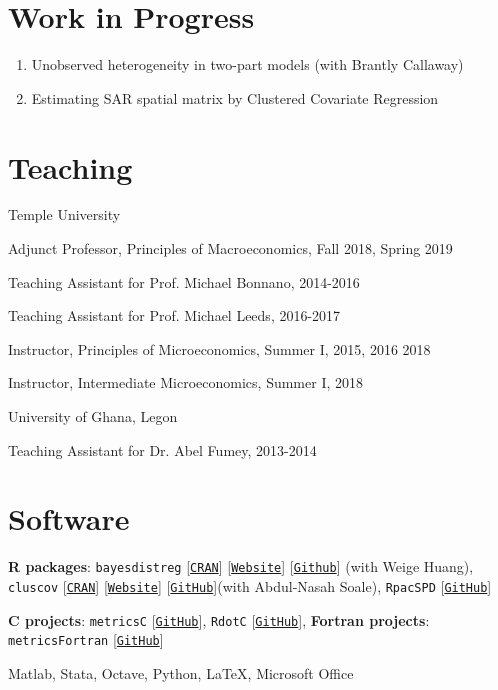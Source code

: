 \documentclass[letterpaper]{article}
\renewenvironment{itemize}{
  \begin{list}{}{
    \setlength{\leftmargin}{1.5em}
  }
}{
  \end{list}
}
\begin{document}
\section*{Work in Progress}
\begin{enumerate}
	\item Unobserved heterogeneity in two-part models (with Brantly Callaway)
	\item Estimating SAR spatial matrix by Clustered Covariate Regression
\end{enumerate}

\section*{Teaching}
\begin{enumerate}
	\item Temple University
	\begin{itemize}
		\item Adjunct Professor, Principles of Macroeconomics, Fall 2018, Spring 2019
		\item Teaching Assistant for Prof. Michael Bonnano, 2014-2016
		\item Teaching Assistant for Prof. Michael Leeds, 2016-2017
		\item Instructor, Principles of Microeconomics, Summer I, 2015, 2016 2018
		\item Instructor, Intermediate Microeconomics, Summer I, 2018
	\end{itemize}
	\item University of Ghana, Legon
	\begin{itemize}
		\item Teaching Assistant for Dr. Abel Fumey, 2013-2014
	\end{itemize}
\end{enumerate}


\section*{Software}
\begin{itemize}
  \item \textbf{R packages}: \texttt{bayesdistreg} [\texttt{\href{https://CRAN.R-project.org/package=bayesdistreg}{CRAN}}] [\texttt{\href{https://estsyawo.github.io/bayesdistreg/}{Website}}] [\texttt{\href{https://github.com/estsyawo/bayesdistreg}{Github}}] (with Weige Huang), \texttt{cluscov} [\texttt{\href{https://CRAN.R-project.org/package=cluscov}{CRAN}}] [\texttt{\href{https://estsyawo.github.io/cluscov/}{Website}}] [\texttt{\href{https://github.com/estsyawo/cluscov}{GitHub}}](with Abdul-Nasah Soale), \texttt{RpacSPD} [\texttt{\href{https://github.com/estsyawo/RpacSPD}{GitHub}}]

  \item \textbf{C projects}: \texttt{metricsC} [\texttt{\href{https://github.com/estsyawo/metricsC}{GitHub}}], \texttt{RdotC} [\texttt{\href{https://github.com/estsyawo/RdotC}{GitHub}}], \textbf{Fortran projects}: \texttt{metricsFortran} [\texttt{\href{https://github.com/estsyawo/metricsFortran}{GitHub}}]
  \item Matlab,  Stata, Octave, Python, \LaTeX, Microsoft Office
\end{itemize}
\end{document}

